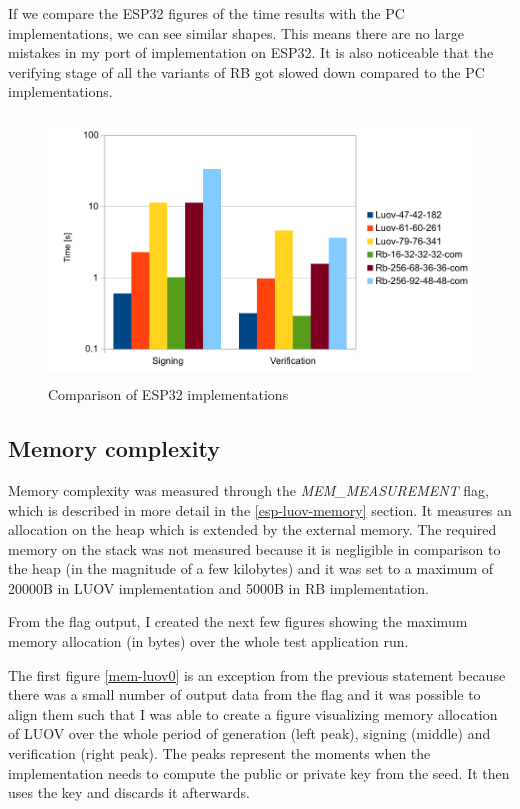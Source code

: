 \documentclass[thesis=M,english]{FITthesis}[2019/12/23]
\begin{document}
\bigskip
\noindent
If we compare the ESP32 figures of the time results with the PC implementations, we can see similar shapes. This means there are no large mistakes in my port of implementation on ESP32. It is also noticeable that the verifying stage of all the variants of RB got slowed down compared to the PC implementations.

\begin{figure}[H]
\centering
\includegraphics[width=13cm,height=7cm]{images/time-both.pdf}
\caption{Comparison of ESP32 implementations}
\label{time-both}
\end{figure}

\subsection{Memory complexity}
Memory complexity was measured through the \textit{MEM\_MEASUREMENT} flag, which is described in more detail in the \ref{esp-luov-memory} section. It measures an allocation on the heap which is extended by the external memory. The required memory on the stack was not measured because it is negligible in comparison to the heap (in the magnitude of a few kilobytes) and it was set to a maximum of 20000B in LUOV implementation and 5000B in RB implementation. 

\bigskip
\noindent
From the flag output, I created the next few figures showing  the maximum memory allocation (in bytes) over the whole test application run.

\bigskip
\noindent
The first figure \ref{mem-luov0} is an exception from the previous statement because there was a small number of output data from the flag and it was possible to align them such that I was able to create a figure visualizing memory allocation of LUOV over the whole period of generation (left peak), signing (middle) and verification (right peak). The peaks represent the moments when the implementation needs to compute the public or private key from the seed. It then uses the key and discards it afterwards. 
\end{document}
